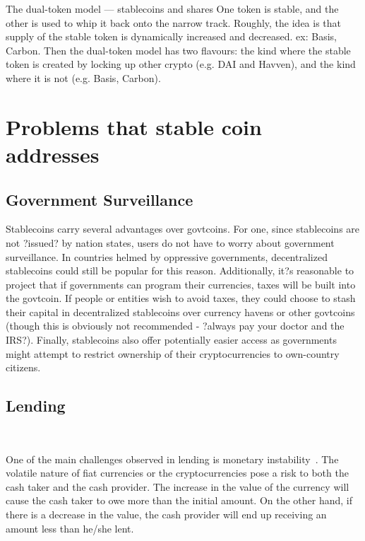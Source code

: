 The dual-token model — stablecoins and shares One token is stable, and the other is used to whip it back onto the narrow track. Roughly, the idea is that supply of the stable token is dynamically increased and decreased. ex: Basis, Carbon. Then the dual-token model has two flavours: the kind where the stable token is created by locking up other crypto (e.g. DAI and Havven), and the kind where it is not (e.g. Basis, Carbon). ~\cite{cryptoinsider}





\section{Problems that stable coin addresses} %
\subsection{Government Surveillance}
Stablecoins carry several advantages over govtcoins. For one, since stablecoins are not ?issued? by nation states, users do not have to worry about government surveillance. In countries helmed by oppressive governments, decentralized stablecoins could still be popular for this reason. Additionally, it?s reasonable to project that if governments can program their currencies, taxes will be built into the govtcoin. If people or entities wish to avoid taxes, they could choose to stash their capital in decentralized stablecoins over currency havens or other govtcoins (though this is obviously not recommended - ?always pay your doctor and the IRS?). Finally, stablecoins also offer potentially easier access as governments might attempt to restrict ownership of their cryptocurrencies to own-country citizens.

\subsection{Lending}
~

One of the main challenges observed in lending is  monetary instability~\cite{okoyetoward}. The volatile nature of fiat currencies or the cryptocurrencies pose a risk to both the cash taker and the cash provider. The increase in the value of the currency will cause the cash taker to owe more than the initial amount. On the other hand, if there is a decrease in the value, the cash provider will end up receiving an amount less than he/she lent.



